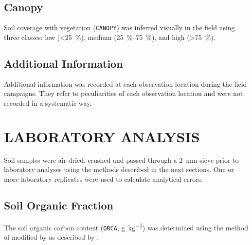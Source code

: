 \subsection{Canopy}

Soil coverage with vegetation (\texttt{CANOPY}) was inferred visually in the field using three classes: low 
(\SI{<25}{\percent}), medium (\SIrange{25}{75}{\percent}), and high (\SI{>75}{\percent}).

\subsection{Additional Information}

Additional information was recorded at each observation location during the field campaigns. They refer to 
peculiarities of each observation location and were not recorded in a systematic way.

\section{LABORATORY ANALYSIS}
\label{sec:chap04-laboratory}

Soil samples were air dried, crushed and passed through a \SI{2}{\milli\metre}-sieve prior to laboratory 
analyses using the methods described in the next sections. One or more laboratory replicates were used to 
calculate analytical errors.

\subsection{Soil Organic Fraction}
\label{sec:chap04-organic}

The soil organic carbon content (\texttt{ORCA}, \si{\gram\per\kilo\gram}) was determined using the method of
 modified by  as described by .

\def\footsulfochromic{\footnote{See a detailed description of the sulfochromic solution, or chromic acid, at 
\href{http://en.wikipedia.org/wiki/Chromic_acid}{Wikipedia}.}}

